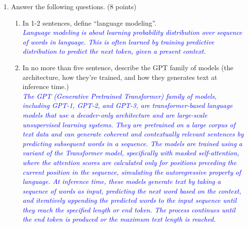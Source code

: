 \documentclass[12pt]{article}
\newcommand{\solution}[2]{\\[2mm] \textcolor{blue}{\em #1}} %
\begin{document}
\begin{enumerate}
\item Answer the following questions. (8 points) 
\begin{enumerate}
        \item In 1-2 sentences, define ``language modeling''. 
    \solution{
         Language modeling is about learning probability distribution over sequence of words in language. 
         This is often learned by training predictive distribution to predict the next token, given a  present context.
    }{
    {\vspace{3cm}}
    }
    \item In no more than five sentence, describe the GPT family of models (the architecture, how they're  trained, and how they generates text at inference time.) 
    \solution{
         The GPT (Generative Pretrained Transformer) family of models, including GPT-1, GPT-2, and GPT-3, are transformer-based language models that use a decoder-only architecture and are large-scale unsupervised learning systems. They are pretrained on a large corpus of text data and can generate coherent and contextually relevant sentences by predicting subsequent words in a sequence. The models are trained using a variant of the Transformer model, specifically with masked self-attention, where the attention scores are calculated only for positions preceding the current position in the sequence, simulating the autoregressive property of language. At inference time, these models generate text by taking a sequence of words as input, predicting the next word based on the context, and iteratively appending the predicted words to the input sequence until they reach the specified length or end token. The process continues until the end token is produced or the maximum text length is reached.
    }{
    {\vspace{5cm}}
    }
\end{enumerate}



\end{enumerate}
\end{document}
